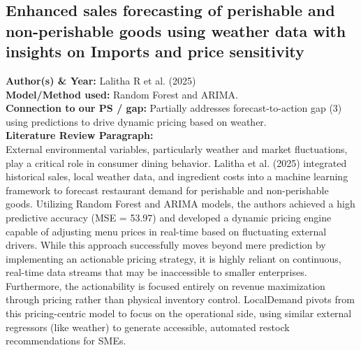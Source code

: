 \documentclass[conference]{IEEEtran}
\begin{document}
\subsection{Enhanced sales forecasting of perishable and non-perishable goods using weather data with insights on Imports and price sensitivity}
\textbf{Author(s) \& Year:} Lalitha R et al. (2025)\\
\textbf{Model/Method used:} Random Forest and ARIMA.\\
\textbf{Connection to our PS / gap:} Partially addresses forecast-to-action gap (3) using predictions to drive dynamic pricing based on weather.\\
\textbf{Literature Review Paragraph:}\\
External environmental variables, particularly weather and market fluctuations, play a critical role in consumer dining behavior. Lalitha et al. (2025) integrated historical sales, local weather data, and ingredient costs into a machine learning framework to forecast restaurant demand for perishable and non-perishable goods. Utilizing Random Forest and ARIMA models, the authors achieved a high predictive accuracy (MSE = 53.97) and developed a dynamic pricing engine capable of adjusting menu prices in real-time based on fluctuating external drivers. While this approach successfully moves beyond mere prediction by implementing an actionable pricing strategy, it is highly reliant on continuous, real-time data streams that may be inaccessible to smaller enterprises. Furthermore, the actionability is focused entirely on revenue maximization through pricing rather than physical inventory control. LocalDemand pivots from this pricing-centric model to focus on the operational side, using similar external regressors (like weather) to generate accessible, automated restock recommendations for SMEs.
\end{document}

